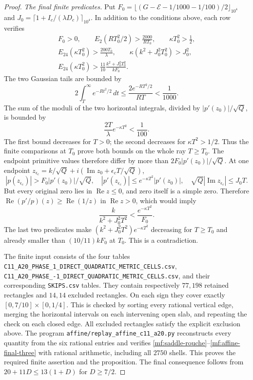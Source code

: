 \documentclass[11pt,reqno]{amsart}
\numberwithin{equation}{section}
\theoremstyle{definition}
\theoremstyle{remark}
\renewcommand{\Re}{\operatorname{Re}}
\renewcommand{\Im}{\operatorname{Im}}
\DeclareRobustCommand{\cert}[1]{\nolinkurl{#1}}
\begin{document}
\begin{proof}
\smallskip
\noindent\emph{The final finite predicates.}
Put
$F_0=\lfloor(G-\mathcal E-1/1000-1/100)/2\rfloor_{10^4}$
and $J_0=\lceil1+I_c/(\lambda D_c)\rceil_{10^4}$.
In addition to the conditions above, each row verifies
\begin{gather}
 F_0>0,\qquad
 E_2(RT_0^2/2)>\frac{2000}{RT_0},\qquad
 \kappa T_0^2>\frac12,\label{mf:affine-final-one}\\
 E_{24}(\kappa T_0^2)>\frac{200T_0}{\lambda},\qquad
 \kappa(k^2+J_0^2T_0^2)>J_0^2,\label{mf:affine-final-two}\\
 E_{24}(\kappa T_0^2)>
       \frac{11}{10}\frac{k^2+J_0^2T_0^2}{kF_0}.
 \label{mf:affine-final-three}
\end{gather}
The two Gaussian tails are bounded by
\[
 2\int_T^\infty e^{-Rt^2/2}\,dt
 \le\frac{2e^{-RT^2/2}}{RT}<\frac1{1000}.
\]
The sum of the moduli of the two horizontal integrals, divided by
$|p'(z_0)|/\sqrt Q$, is bounded by
\[
 \frac{2T}{\lambda}e^{-\kappa T^2}<\frac1{100}.
\]
The first bound decreases for $T>0$; the second decreases for
$\kappa T^2>1/2$. Thus the finite comparisons at $T_0$ prove both
bounds on the whole ray $T\ge T_0$.
The endpoint primitive values therefore differ by more than
$2F_0|p'(z_0)|/\sqrt Q$. At one endpoint
$z_{\epsilon_c}=k/\sqrt Q+i(\Im z_0+\epsilon_c T/\sqrt Q)$,
\[
 |p(z_{\epsilon_c})|>F_0|p'(z_0)|/\sqrt Q,\quad
 |p'(z_{\epsilon_c})|\le e^{-\kappa T^2}|p'(z_0)|,\quad
 \sqrt Q|\Im z_{\epsilon_c}|\le J_0T.
\]
But every original zero lies in $\Re z\le0$, and zero itself
is a simple zero. Therefore
$\Re(p'/p)(z)\ge\Re(1/z)$ in $\Re z>0$, which would imply
\[
 \frac{k}{k^2+J_0^2T^2}<\frac{e^{-\kappa T^2}}{F_0}.
\]
The last two predicates make
$(k^2+J_0^2T^2)e^{-\kappa T^2}$ decreasing for $T\ge T_0$
and already smaller than $(10/11)kF_0$ at $T_0$.
This is a contradiction.

The finite input consists of the four tables
\cert{C11_A20_PHASE_1_DIRECT_QUADRATIC_METRIC_CELLS.csv},
\cert{C11_A20_PHASE_-1_DIRECT_QUADRATIC_METRIC_CELLS.csv},
and their corresponding \cert{SKIPS.csv} tables.
They contain respectively $77,198$ retained rectangles and
$14,14$ excluded rectangles. On each sign they cover exactly
$[0,7/10]\times[0,1/4]$. This is checked by sorting every
rational vertical edge, merging the horizontal intervals on
each intervening open slab, and repeating the check on each
closed edge. All excluded rectangles satisfy the explicit
exclusion above. The program
\cert{affine/replay_affine_c11_a20.py} reconstructs every
quantity from the six rational entries and verifies
\eqref{mf:saddle-rouche}--\eqref{mf:affine-final-three}
with rational arithmetic, including all $2750$ shells.
This proves the required finite assertion and the proposition.
The final consequence follows from $20+11D\le13(1+D)$
for $D\ge7/2$.
\end{proof}
\end{document}
